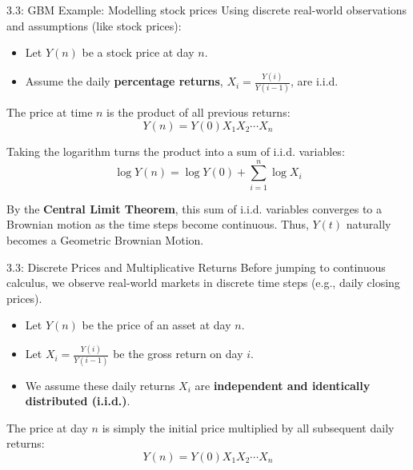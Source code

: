\documentclass{beamer}
\begin{document}
	\begin{frame}{3.3: GBM Example: Modelling stock prices}
		Using discrete real-world observations and assumptions (like stock prices):
		\begin{itemize}
			\item Let $Y(n)$ be a stock price at day $n$.
			\item Assume the daily \textbf{percentage returns}, $X_i = \frac{Y(i)}{Y(i-1)}$, are i.i.d.
		\end{itemize}
		
		\vspace{0.3cm}
		The price at time $n$ is the product of all previous returns:
		$$Y(n) = Y(0) X_1 X_2 \cdots X_n$$
		
		Taking the logarithm turns the product into a sum of i.i.d. variables:
		$$\log Y(n) = \log Y(0) + \sum_{i=1}^n \log X_i$$
		
		\vspace{0.3cm}
		By the \textbf{Central Limit Theorem}, this sum of i.i.d. variables converges to a Brownian motion as the time steps become continuous. Thus, $Y(t)$ naturally becomes a Geometric Brownian Motion.
	\end{frame}
	
	\begin{frame}{3.3: Discrete Prices and Multiplicative Returns}
		Before jumping to continuous calculus, we observe real-world markets in discrete time steps (e.g., daily closing prices).
		
		\begin{itemize}
			\item Let $Y(n)$ be the price of an asset at day $n$.
			\item Let $X_i = \frac{Y(i)}{Y(i-1)}$ be the gross return on day $i$. 
			\item We assume these daily returns $X_i$ are \textbf{independent and identically distributed (i.i.d.)}.
		\end{itemize}
		
		The price at day $n$ is simply the initial price multiplied by all subsequent daily returns:
		$$Y(n) = Y(0) X_1 X_2 \cdots X_n$$
	\end{frame}
	
\end{document}

